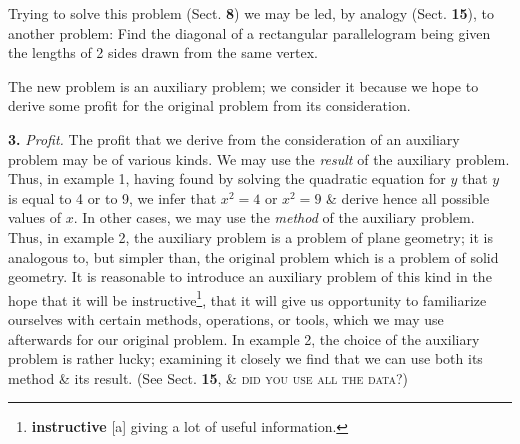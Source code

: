 \documentclass[oneside]{book}
\numberwithin{equation}{section}
\begin{document}
Trying to solve this problem (Sect. \textbf{8}) we may be led, by analogy (Sect. \textbf{15}), to another problem: Find the diagonal of a rectangular parallelogram being given the lengths of 2 sides drawn from the same vertex.

The new problem is an auxiliary problem; we consider it because we hope to derive some profit for the original problem from its consideration.

\textbf{3.} \textit{Profit.} The profit that we derive from the consideration of an auxiliary problem may be of various kinds. We may use the \textit{result} of the auxiliary problem. Thus, in example 1, having found by solving the quadratic equation for $y$ that $y$ is equal to 4 or to 9, we infer that $x^2 = 4$ or $x^2 = 9$ \& derive hence all possible values of $x$. In other cases, we may use the \textit{method} of the auxiliary problem. Thus, in example 2, the auxiliary problem is a problem of plane geometry; it is analogous to, but simpler than, the original problem which is a problem of solid geometry. It is reasonable to introduce an auxiliary problem of this kind in the hope that it will be instructive\footnote{\textbf{instructive} [a] giving a lot of useful information.}, that it will give us opportunity to familiarize ourselves with certain methods, operations, or tools, which we may use afterwards for our original problem. In example 2, the choice of the auxiliary problem is rather lucky; examining it closely we find that we can use both its method \& its result. (See Sect. \textbf{15}, \& \textsc{did you use all the data?})
\end{document}
